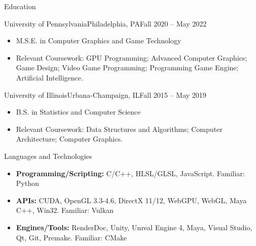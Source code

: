 \documentclass[]{mcdowellcv}
\begin{document}
	\makeheader
	

	\begin{cvsection}{Education}
		\begin{cvsubsection}{University of Pennsylvania}{Philadelphia, PA}{Fall 2020 -- May 2022}
			\begin{itemize}
				\item M.S.E. in Computer Graphics and Game Technology
				\item Relevant Coursework: GPU Programming; Advanced Computer Graphics; Game Design; Video Game Programming; Programming Game Engine; Artificial Intelligence.
			\end{itemize}
		\end{cvsubsection}
		\begin{cvsubsection}{University of Illinois}{Urbana-Champaign, IL}{Fall 2015 -- May 2019}
			\begin{itemize}
				\item B.S. in Statistics and Computer Science
				\item Relevant Coursework: Data Structures and Algorithms; Computer Architecture; Computer Graphics.
			\end{itemize}
		\end{cvsubsection}
	\end{cvsection}

	\begin{cvsection}{Languages and Technologies}
		\begin{cvsubsection}{}{}{}	
			\begin{itemize}
				\item \textbf{Programming/Scripting:} C/C++, HLSL/GLSL, JavaScript. Familiar: Python 
				\item \textbf{APIs:} CUDA, OpenGL 3.3-4.6, DirectX 11/12, WebGPU, WebGL, Maya C++, Win32. Familiar: Vulkan
				\item \textbf{Engines/Tools:} RenderDoc, Unity, Unreal Engine 4, Maya, Visual Studio, Qt, Git, Premake. Familiar: CMake
			\end{itemize}
		\end{cvsubsection}
	\end{cvsection}
	
\end{document}
